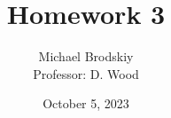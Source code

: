 


\title{Homework 3}
\date{October 5, 2023}
\author{Michael Brodskiy\\ \small Professor: D. Wood}



\maketitle

